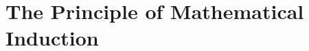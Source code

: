 \section{The Principle of Mathematical Induction} \label{S:mathinduction}
\setcounter{previewactivity}{0}
%


%










%
%
%
%	
%
%
%
%
